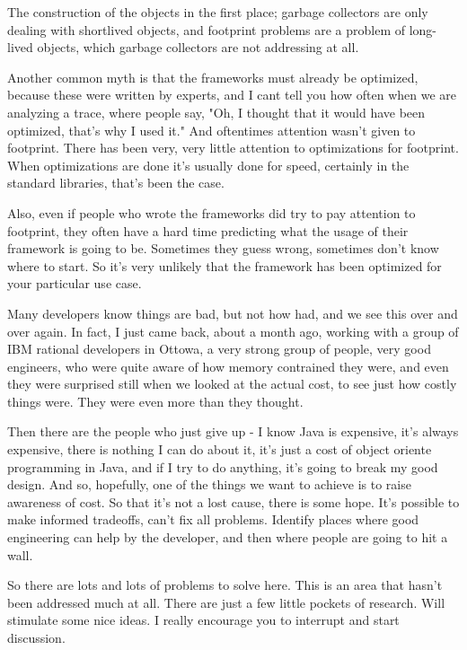The construction of the objects in the first place; garbage collectors are only dealing with shortlived objects, and footprint problems are a problem of long-lived objects, which garbage collectors are not addressing at all.

Another common myth is that the frameworks must already be optimized, because these were written by experts, and I cant tell you how often when we are analyzing a trace, where people say, "Oh, I thought that it would have been optimized, that's why I used it." And oftentimes attention wasn't given to footprint. There has been very, very little attention to optimizations for footprint.  When optimizations are done it's usually done for speed, certainly in the standard libraries, that's been the case.

Also, even if people who wrote the frameworks did try to pay attention to footprint, they often have a hard time predicting what the usage of their framework is going to be. Sometimes they guess wrong, sometimes don't know where to start.  So it's very unlikely that the framework has been optimized for your particular use case. 

Many developers know things are bad, but not how had, and we see this over and over again. In fact, I just came back, about a month ago, working with a group of IBM rational developers in Ottowa, a very strong group of people, very good engineers, who were quite aware of how memory contrained they were, and even they were surprised still when we looked at the actual cost, to see just how costly things were. They were even more than they thought.

Then there are the people who just give up - I know Java is expensive, it's always expensive, there is nothing I can do about it, it's just a cost of object oriente programming in Java, and if I try to do anything, it's going to break my good design.
And so, hopefully, one of the things we want to achieve is to raise awareness of cost. So that it's not a lost cause, there is some hope.  It's possible to make informed tradeoffs, can't fix all problems. Identify places where good engineering can help by the developer, and then where people are going to hit a wall.

So there are lots and lots of problems to solve here. This is an area that hasn't been addressed much at all.  There are just a few little pockets of research. Will stimulate some nice ideas. I really encourage you to interrupt and start discussion.

